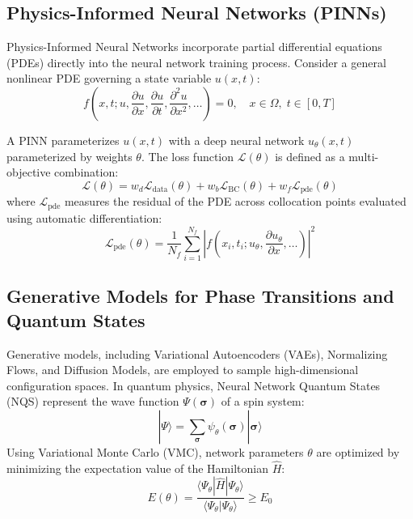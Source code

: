 \documentclass[11pt,a4paper]{article}
\begin{document}
\subsection{Physics-Informed Neural Networks (PINNs)}
Physics-Informed Neural Networks incorporate partial differential equations (PDEs) directly into the neural network training process. Consider a general nonlinear PDE governing a state variable $u(x, t)$:
\begin{equation}
    f\left(x, t; u, \frac{\partial u}{\partial x}, \frac{\partial u}{\partial t}, \frac{\partial^2 u}{\partial x^2}, \dots\right) = 0, \quad x \in \Omega, \; t \in [0, T]
\end{equation}

A PINN parameterizes $u(x, t)$ with a deep neural network $u_\theta(x, t)$ parameterized by weights $\theta$. The loss function $\mathcal{L}(\theta)$ is defined as a multi-objective combination:
\begin{equation}
    \mathcal{L}(\theta) = w_d \mathcal{L}_{\text{data}}(\theta) + w_b \mathcal{L}_{\text{BC}}(\theta) + w_f \mathcal{L}_{\text{pde}}(\theta)
\end{equation}
where $\mathcal{L}_{\text{pde}}$ measures the residual of the PDE across collocation points evaluated using automatic differentiation:
\begin{equation}
    \mathcal{L}_{\text{pde}}(\theta) = \frac{1}{N_f} \sum_{i=1}^{N_f} \left| f\left(x_i, t_i; u_\theta, \frac{\partial u_\theta}{\partial x}, \dots\right) \right|^2
\end{equation}

\subsection{Generative Models for Phase Transitions and Quantum States}
Generative models, including Variational Autoencoders (VAEs), Normalizing Flows, and Diffusion Models, are employed to sample high-dimensional configuration spaces. In quantum physics, Neural Network Quantum States (NQS) represent the wave function $\Psi(\boldsymbol{\sigma})$ of a spin system:
\begin{equation}
    |\Psi\rangle = \sum_{\boldsymbol{\sigma}} \psi_\theta(\boldsymbol{\sigma}) |\boldsymbol{\sigma}\rangle
\end{equation}
Using Variational Monte Carlo (VMC), network parameters $\theta$ are optimized by minimizing the expectation value of the Hamiltonian $\hat{H}$:
\begin{equation}
    E(\theta) = \frac{\langle \Psi_\theta | \hat{H} | \Psi_\theta \rangle}{\langle \Psi_\theta | \Psi_\theta \rangle} \ge E_0
\end{equation}
\end{document}

